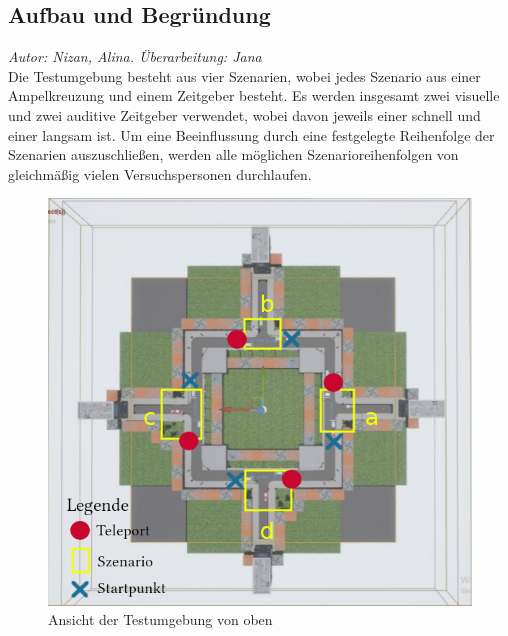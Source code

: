 \documentclass{Paper}
\begin{document}


\subsection{Aufbau und Begründung}
\label{aufbau}
       \textit{Autor: Nizan, Alina. Überarbeitung: Jana}\\
Die Testumgebung besteht aus vier Szenarien, wobei jedes Szenario aus einer Ampelkreuzung und einem Zeitgeber besteht. Es werden insgesamt zwei visuelle und zwei auditive Zeitgeber verwendet, wobei davon jeweils einer schnell und einer langsam ist.
Um eine Beeinflussung durch eine festgelegte Reihenfolge der Szenarien auszuschließen, werden alle möglichen Szenarioreihenfolgen von gleichmäßig vielen Versuchspersonen durchlaufen.

\begin{figure}[H]
	\centering
	\includegraphics[scale=0.7]{../Bilder/mapLegende.png}
	\caption{Ansicht der Testumgebung von oben}
	\label{img:map}
\end{figure}
\end{document}
